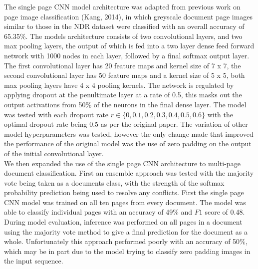 \documentclass[a4paper,12pt]{article}
\begin{document}
The single page CNN model architecture was adapted from previous work on page image classification (Kang, 2014), in which greyscale document page images similar to those in the NDR dataset were classified with an overall accuracy of 65.35\%. The models architecture consists of two convolutional layers, and two max pooling layers, the output of which is fed into a two layer dense feed forward network with 1000 nodes in each layer, followed by a final softmax output layer. The first convolutional layer has 20 feature maps and kernel size of 7 x 7, the second convolutional layer has 50 feature maps and a kernel size of 5 x 5, both max pooling layers have 4 x 4 pooling kernels. The network is regulated by applying dropout at the penultimate layer at a rate of 0.5, this masks out the output activations from 50\% of the neurons in the final dense layer. The model was tested with each dropout rate $ r \in \{0, 0.1, 0.2, 0.3, 0.4, 0.5, 0.6\}$ with the optimal dropout rate being 0.5 as per the original paper. The variation of other model hyperparameters was tested, however the only change made that improved the performance of the original model was the use of zero padding on the output of the initial convolutional layer. \\

We then expanded the use of the single page CNN architecture to multi-page document classification. First an ensemble approach was tested with the majority vote being taken as a documents class, with the strength of the softmax probability prediction being used to resolve any conflicts. First the single page CNN model was trained on all ten pages from every document. The model was able to classify individual pages with an accuracy of 49\% and $F1$ score of 0.48. During model evaluation, inference was performed on all pages in a document using the majority vote method to give a final prediction for the document as a whole. Unfortunately this approach performed poorly with an accuracy of 50\%, which may be in part due to the model trying to classify zero padding images in the input sequence. \\
\end{document}
